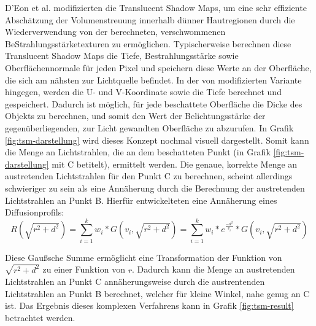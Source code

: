 \documentclass[ngerman,runningheads,a4paper]{llncs}[2018/03/10]
\begin{document}
D'Eon et al. modifizierten die Translucent Shadow Maps, um eine sehr effiziente Abschätzung der Volumenstreuung innerhalb dünner Hautregionen durch die Wiederverwendung von der berechneten, verschwommenen BeStrahlungsstärketexturen zu ermöglichen.
Typischerweise berechnen diese Translucent Shadow Maps die Tiefe, Bestrahlungsstärke sowie Oberflächennormale für jeden Pixel und speichern diese Werte an der Oberfläche, die sich am nähsten zur Lichtquelle befindet.
In der von \citeauthor{efficient-human-skin-rendering} modifizierten Variante hingegen, werden die U- und V-Koordinate sowie die Tiefe berechnet und gespeichert.
Dadurch ist möglich, für jede beschattete Oberfläche die Dicke des Objekts zu berechnen, und somit den Wert der Belichtungsstärke der gegenüberliegenden, zur Licht gewandten Oberfläche zu abzurufen.
In Grafik \ref{fig:tsm-darstellung} wird dieses Konzept nochmal visuell dargestellt.
Somit kann die Menge an Lichtstrahlen, die an dem beschatteten Punkt (in Grafik \ref{fig:tsm-darstellung} mit C betitelt), ermittelt werden.
Die genaue, korrekte Menge an austretenden Lichtstrahlen für den Punkt C zu berechnen, scheint allerdings schwieriger zu sein als eine Annäherung durch die Berechnung der austretenden Lichtstrahlen an Punkt B.
Hierfür entwickelteten \citeauthor{efficient-human-skin-rendering} eine Annäherung eines Diffusionprofils:
$$R(\sqrt{r^2 + d^2}) = \sum_{i=1}^{k} w_i * G(v_i, \sqrt{r^2 + d^2}) = \sum_{i=1}^{k} w_i * e^{\frac{-d^2}{v_i}} * G(v_i, \sqrt{r^2 + d^2}) $$

Diese Gaußsche Summe ermöglicht eine Transformation der Funktion von $\sqrt{r^2 + d^2}$ zu einer Funktion von $r$.
Dadurch kann die Menge an austretenden Lichtstrahlen an Punkt C annäherungsweise durch die austrentenden Lichtstrahlen an Punkt B berechnet, welcher für kleine Winkel, nahe genug an C ist.
Das Ergebnis dieses komplexen Verfahrens kann in Grafik \ref{fig:tsm-result} betrachtet werden.
\end{document}
